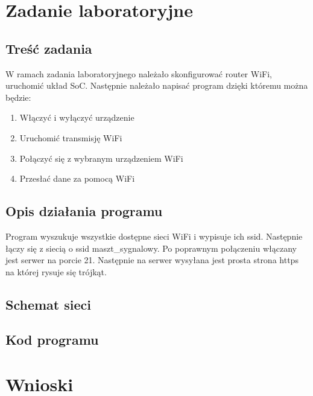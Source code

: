 \documentclass{article}
\begin{document}
    \section{Zadanie laboratoryjne}
        \subsection{Treść zadania}
            W ramach zadania laboratoryjnego należało skonfigurować router WiFi, uruchomić układ SoC.
            Następnie należało napisać program dzięki któremu można będzie:
            \begin{enumerate}
                \item Włączyć i wyłączyć urządzenie
                \item Uruchomić transmisję WiFi
                \item Połączyć się z wybranym urządzeniem WiFi
                \item Przesłać dane za pomocą WiFi
            \end{enumerate}
        \subsection{Opis działania programu}
            Program wyszukuje wszystkie dostępne sieci WiFi i wypisuje ich ssid. Następnie łączy się 
            z siecią o ssid maszt\_sygnalowy. Po poprawnym połączeniu włączany jest serwer na porcie 21.
            Następnie na serwer wysyłana jest prosta strona https na której rysuje się trójkąt.
        \subsection{Schemat sieci}
        \subsection{Kod programu}
    \section{Wnioski}
\end{document}
